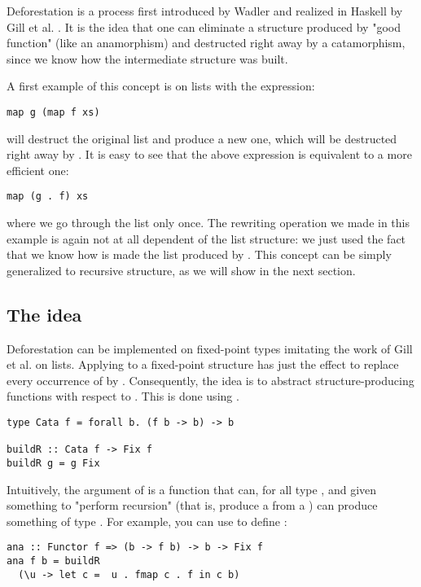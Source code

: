 
Deforestation is a process first introduced by Wadler \cite{WADLER1990231} and realized in Haskell by Gill et al. \cite{Gill:1993:SCD:165180.165214}. It is the idea that one can eliminate a structure produced by "good function" (like an anamorphism) and destructed right away by a catamorphism, since we know how the intermediate structure was built.

A first example of this concept is on lists with the expression:
\begin{verbatim}
map g (map f xs)
\end{verbatim}
 will destruct the original list and produce a new one, which will be destructed right away by . It is easy to see that the above expression is equivalent to a more efficient one:
\begin{verbatim}
map (g . f) xs
\end{verbatim}
\noindent where we go through the list only once.
The rewriting operation we made in this example is again not at all dependent of the list structure: we just used the fact that we know how is made the list produced by . This concept can be simply generalized to recursive structure, as we will show in the next section.

\subsection{The idea}
Deforestation can be implemented on fixed-point types imitating the work of Gill et al. \cite{Gill:1993:SCD:165180.165214} on lists. Applying  to a fixed-point structure has just the effect to replace every occurrence of  by . Consequently, the idea is to abstract structure-producing functions with respect to . This is done using .

\begin{verbatim}
type Cata f = forall b. (f b -> b) -> b

buildR :: Cata f -> Fix f
buildR g = g Fix
\end{verbatim}

\noindent Intuitively, the argument of  is a function that can, for all type , and given something to "perform recursion" (that is, produce a  from a ) can produce something of type . For example, you can use  to define :
\begin{verbatim}
ana :: Functor f => (b -> f b) -> b -> Fix f
ana f b = buildR
  (\u -> let c =  u . fmap c . f in c b)
\end{verbatim}

